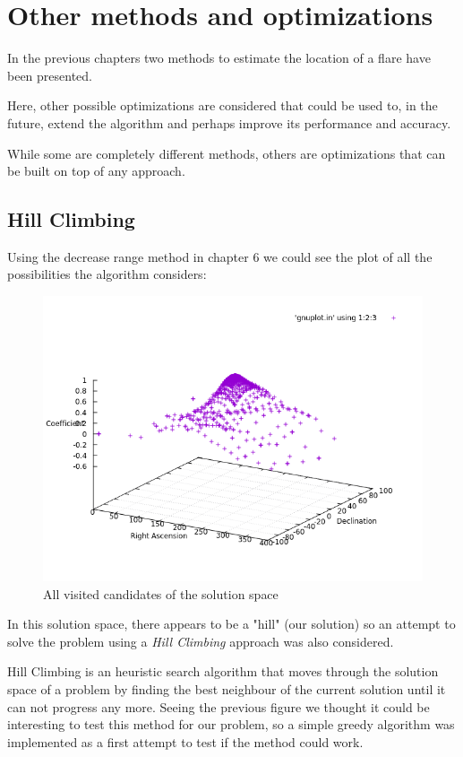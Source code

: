 \chapter{Other methods and optimizations}\label{otherMethods}

In the previous chapters two methods to estimate the location of a flare have been presented. 

Here, other possible optimizations are considered that could be used to, in the future, extend the algorithm and perhaps improve its performance and accuracy.

While some are completely different methods, others are optimizations that can be built on top of any approach.

\section{Hill Climbing}

Using the decrease range method in chapter 6 we could see the plot of all the possibilities the algorithm considers:

\begin{figure}[!htb]
	\begin{centering}
		\includegraphics[width=0.5\linewidth]{images/ch6/hillClimbing/resultsAll.png}
		\caption{All visited candidates of the solution space}
		\label{fig:solutionSpace}
	\end{centering}
\end{figure}

In this solution space, there appears to be a "hill" (our solution) so an attempt to solve the problem using a \textit{Hill Climbing} approach was also considered.

Hill Climbing is an heuristic search algorithm that moves through the solution space of a problem by finding the best neighbour of the current solution until it can not progress any more. Seeing the previous figure we thought it could be interesting to test this method for our problem, so a simple greedy algorithm was implemented as a first attempt to test if the method could work.


